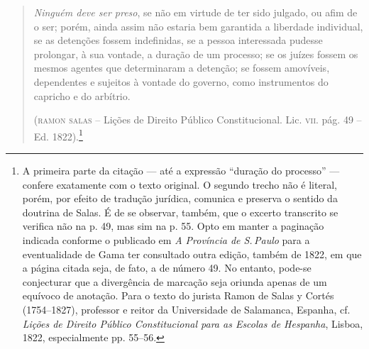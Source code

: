{\begin{quote}
\emph{Ninguém deve ser preso}, se não em virtude de ter sido julgado,
ou afim de o ser; porém, ainda assim não estaria bem garantida a
liberdade individual, se as detenções fossem indefinidas, se a pessoa
interessada pudesse prolongar, à sua vontade, a duração de um processo;
se os juízes fossem os mesmos agentes que determinaram a detenção; se
fossem amovíveis, dependentes e sujeitos à vontade do governo, como
instrumentos do capricho e do arbítrio.

(\textsc{ramon salas} -- Lições de
Direito Público Constitucional. Lic. \textsc{vii}. pág. 49 -- Ed.
1822).\footnote{A primeira parte da citação --- até a expressão
  ``duração do processo'' --- confere exatamente com o texto original. O
  segundo trecho não é literal, porém, por efeito de tradução jurídica,
  comunica e preserva o sentido da doutrina de Salas. É de se observar,
  também, que o excerto transcrito se verifica não na p. 49, mas sim na
  p. 55. Opto em manter a paginação indicada conforme o publicado em
  \emph{A Província de S.\,Paulo} para a eventualidade de Gama ter
  consultado outra edição, também de 1822, em que a página citada seja,
  de fato, a de número 49. No entanto, pode-se conjecturar que a
  divergência de marcação seja oriunda apenas de um equívoco de
  anotação. Para o texto do jurista Ramon de Salas y Cortés (1754--1827),
  professor e reitor da Universidade de Salamanca, Espanha, cf.
  \emph{Lições de Direito Público Constitucional para as Escolas de
  Hespanha}, Lisboa, 1822, especialmente pp. 55--56.}
 \end{quote} 

}
